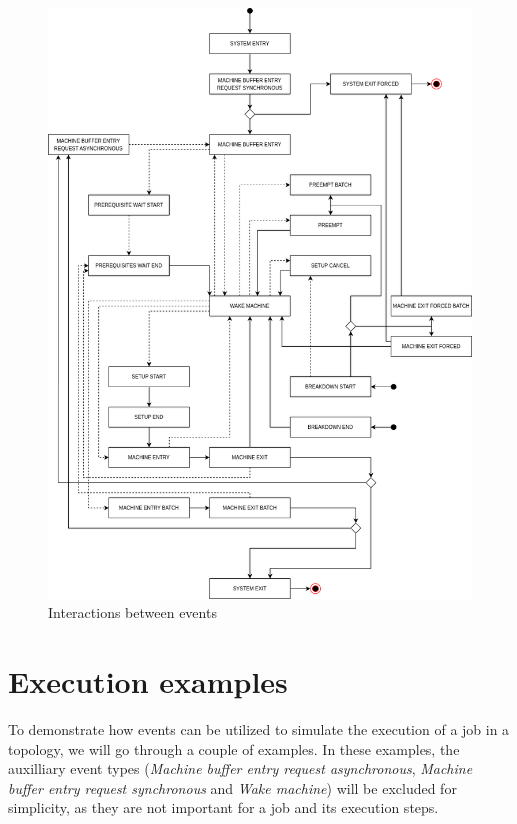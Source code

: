 \begin{figure}[!htbp]
	\centering
	\includegraphics[scale=0.5]{../images/events.png}
	\caption{Interactions between events}
    \label{fig:interactions_between_events}
\end{figure}

\section{Execution examples}
\label{sec:execution_examples}

To demonstrate how events can be utilized to simulate the execution of a job in a topology, we will go through a couple of examples. In these examples, the auxilliary event types (\textit{Machine buffer entry request asynchronous}, \textit{Machine buffer entry request synchronous} and \textit{Wake machine}) will be excluded for simplicity, as they are not important for a job and its execution steps.


